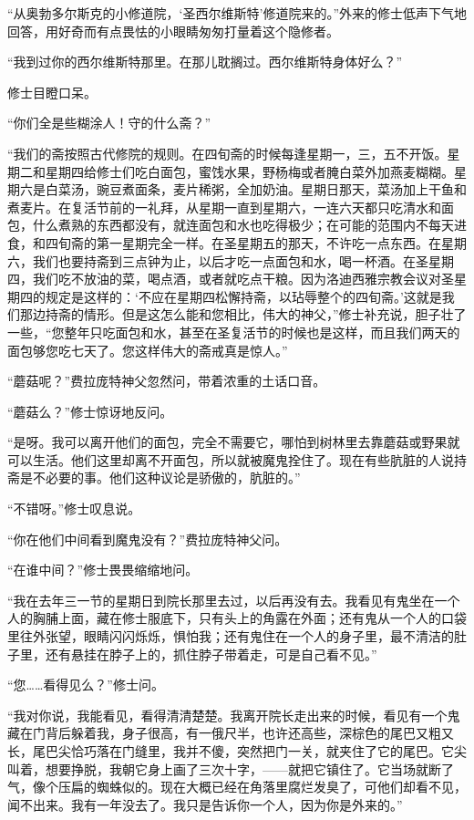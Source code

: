 \par “从奥勃多尔斯克的小修道院，‘圣西尔维斯特’修道院来的。”外来的修士低声下气地回答，用好奇而有点畏怯的小眼睛匆匆打量着这个隐修者。
\par “我到过你的西尔维斯特那里。在那儿耽搁过。西尔维斯特身体好么？”
\par 修士目瞪口呆。
\par “你们全是些糊涂人！守的什么斋？”
\par “我们的斋按照古代修院的规则。在四旬斋的时候每逢星期一，三，五不开饭。星期二和星期四给修士们吃白面包，蜜饯水果，野杨梅或者腌白菜外加燕麦糊糊。星期六是白菜汤，豌豆煮面条，麦片稀粥，全加奶油。星期日那天，菜汤加上干鱼和煮麦片。在复活节前的一礼拜，从星期一直到星期六，一连六天都只吃清水和面包，什么煮熟的东西都没有，就连面包和水也吃得极少；在可能的范围内不每天进食，和四旬斋的第一星期完全一样。在圣星期五的那天，不许吃一点东西。在星期六，我们也要持斋到三点钟为止，以后才吃一点面包和水，喝一杯酒。在圣星期四，我们吃不放油的菜，喝点酒，或者就吃点干粮。因为洛迪西雅宗教会议对圣星期四的规定是这样的：‘不应在星期四松懈持斋，以玷辱整个的四旬斋。’这就是我们那边持斋的情形。但是这怎么能和您相比，伟大的神父，”修士补充说，胆子壮了一些，“您整年只吃面包和水，甚至在圣复活节的时候也是这样，而且我们两天的面包够您吃七天了。您这样伟大的斋戒真是惊人。”
\par “蘑菇呢？”费拉庞特神父忽然问，带着浓重的土话口音。
\par “蘑菇么？”修士惊讶地反问。
\par “是呀。我可以离开他们的面包，完全不需要它，哪怕到树林里去靠蘑菇或野果就可以生活。他们这里却离不开面包，所以就被魔鬼拴住了。现在有些肮脏的人说持斋是不必要的事。他们这种议论是骄傲的，肮脏的。”
\par “不错呀。”修士叹息说。
\par “你在他们中间看到魔鬼没有？”费拉庞特神父问。
\par “在谁中间？”修士畏畏缩缩地问。
\par “我在去年三一节的星期日到院长那里去过，以后再没有去。我看见有鬼坐在一个人的胸脯上面，藏在修士服底下，只有头上的角露在外面；还有鬼从一个人的口袋里往外张望，眼睛闪闪烁烁，惧怕我；还有鬼住在一个人的身子里，最不清洁的肚子里，还有悬挂在脖子上的，抓住脖子带着走，可是自己看不见。”
\par “您……看得见么？”修士问。
\par “我对你说，我能看见，看得清清楚楚。我离开院长走出来的时候，看见有一个鬼藏在门背后躲着我，身子很高，有一俄尺半，也许还高些，深棕色的尾巴又粗又长，尾巴尖恰巧落在门缝里，我并不傻，突然把门一关，就夹住了它的尾巴。它尖叫着，想要挣脱，我朝它身上画了三次十字，——就把它镇住了。它当场就断了气，像个压扁的蜘蛛似的。现在大概已经在角落里腐烂发臭了，可他们却看不见，闻不出来。我有一年没去了。我只是告诉你一个人，因为你是外来的。”
